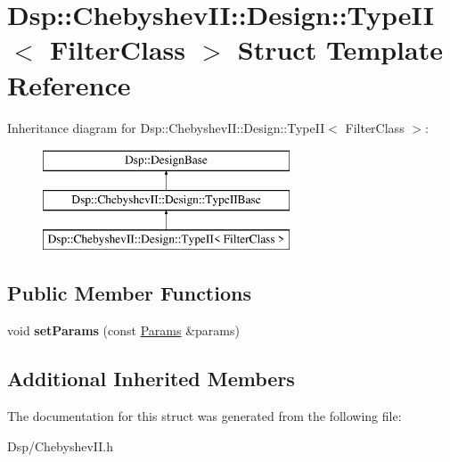 \hypertarget{structDsp_1_1ChebyshevII_1_1Design_1_1TypeII}{\section{Dsp\-:\-:Chebyshev\-I\-I\-:\-:Design\-:\-:Type\-I\-I$<$ Filter\-Class $>$ Struct Template Reference}
\label{structDsp_1_1ChebyshevII_1_1Design_1_1TypeII}
}
Inheritance diagram for Dsp\-:\-:Chebyshev\-I\-I\-:\-:Design\-:\-:Type\-I\-I$<$ Filter\-Class $>$\-:\begin{figure}[H]
\begin{center}
\leavevmode
\includegraphics[height=3.000000cm]{structDsp_1_1ChebyshevII_1_1Design_1_1TypeII}
\end{center}
\end{figure}
\subsection*{Public Member Functions}
\begin{DoxyCompactItemize}
\item 
\hypertarget{structDsp_1_1ChebyshevII_1_1Design_1_1TypeII_ae035595eabc7631baa646d232897153c}{void {\bfseries set\-Params} (const \hyperlink{structDsp_1_1Params}{Params} \&params)}\label{structDsp_1_1ChebyshevII_1_1Design_1_1TypeII_ae035595eabc7631baa646d232897153c}

\end{DoxyCompactItemize}
\subsection*{Additional Inherited Members}


The documentation for this struct was generated from the following file\-:\begin{DoxyCompactItemize}
\item 
Dsp/Chebyshev\-I\-I.\-h\end{DoxyCompactItemize}
